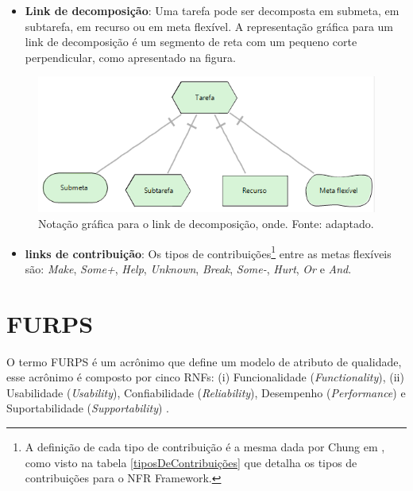 \begin{itemize}	
	\item \textbf{Link de decomposição}: Uma tarefa pode ser decomposta em submeta, em subtarefa, em recurso ou em meta flexível. A representação gráfica para um link de decomposição é um segmento de reta com um pequeno corte perpendicular, como apresentado na figura.    
\end{itemize}	

\begin{figure}[h!]
		\centering
		\includegraphics[keepaspectratio=true,scale=1.0]{figuras/decomposicaoLink.PNG}
		\caption{Notação gráfica para o link de decomposição, onde. Fonte: \cite{istarwiki20} adaptado.}
		\label{decomposicaoLink}
\end{figure}

\begin{itemize}		
	\item \textbf{links de contribuição}: Os tipos de contribuições\footnote[1]{A definição de cada tipo de contribuição é a mesma dada por Chung em \cite{chung2012non}, como visto na tabela \ref{tiposDeContribuições} que detalha os tipos de contribuições para o NFR Framework.} entre as metas flexíveis são: \textit{Make}, \textit{Some+}, \textit{Help}, \textit{Unknown}, \textit{Break}, \textit{Some-}, \textit{Hurt}, \textit{Or} e \textit{And}. 
\end{itemize}


\section{FURPS}
\label{sec:furps}

O termo FURPS é um acrônimo que define um modelo de atributo de qualidade, esse acrônimo é composto por cinco RNFs: (i) Funcionalidade (\textit{Functionality}), (ii) Usabilidade (\textit{Usability}), Confiabilidade (\textit{Reliability}), Desempenho (\textit{Performance}) e Suportabilidade (\textit{Supportability}) \cite{umar2011analyzing}.


